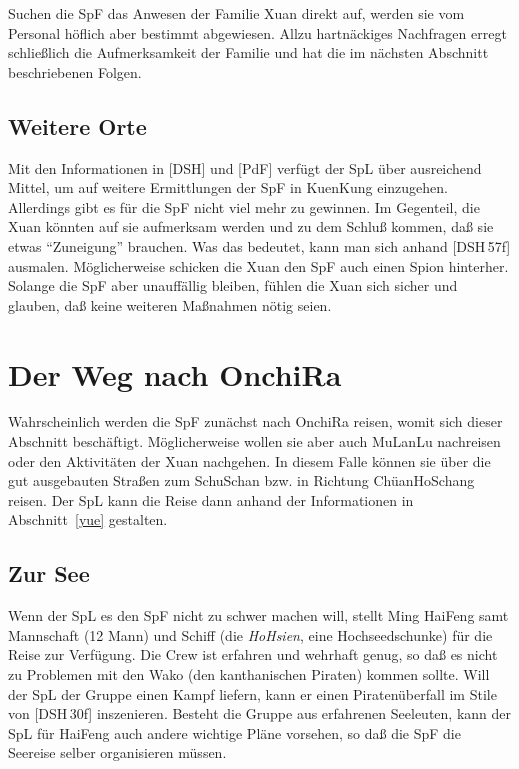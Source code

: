 \documentclass[
a4paper,
twoside,
DIV=calc,
BCOR=4mm,
fontsize=9pt,
twocolumn=on,
titlepage=on,
parskip=half
]{scrartcl}
\begin{document}
Suchen die SpF das Anwesen der Familie Xuan direkt auf, werden sie vom
Personal höflich aber bestimmt abgewiesen. Allzu hartnäckiges
Nachfragen erregt schließlich die Aufmerksamkeit der Familie und hat
die im nächsten Abschnitt beschriebenen Folgen.

\subsection{Weitere Orte}

Mit den Informationen in [DSH] und [PdF] verfügt der SpL über
ausreichend Mittel, um auf weitere Ermittlungen der SpF in KuenKung
einzugehen. Allerdings gibt es für die SpF nicht viel mehr zu
gewinnen. Im Gegenteil, die Xuan könnten auf sie aufmerksam werden
und zu dem Schluß kommen, daß sie etwas "`Zuneigung"' brauchen. Was
das bedeutet, kann man sich anhand [DSH\,57f] ausmalen. Möglicherweise
schicken die Xuan den SpF auch einen Spion hinterher. Solange die SpF
aber unauffällig bleiben, fühlen die Xuan sich sicher und glauben,
daß keine weiteren Maßnahmen nötig seien.

\section{Der Weg nach OnchiRa}

Wahrscheinlich werden die SpF zunächst nach OnchiRa reisen, womit sich
dieser Abschnitt beschäftigt. Möglicherweise wollen sie aber auch
MuLanLu nachreisen oder den Aktivitäten der Xuan nachgehen. In diesem
Falle können sie über die gut ausgebauten Straßen zum SchuSchan
bzw. in Richtung ChüanHoSchang reisen. Der SpL kann die Reise dann
anhand der Informationen in Abschnitt~\ref{yue} gestalten.

\subsection{Zur See}

Wenn der SpL es den SpF nicht zu schwer machen will, stellt Ming
HaiFeng samt Mannschaft (12 Mann) und Schiff (die \emph{HoHsien}, eine
Hochseedschunke) für die Reise zur Verfügung. Die Crew ist erfahren
und wehrhaft genug, so daß es nicht zu Problemen mit den Wako (den
kanthanischen Piraten) kommen sollte. Will der SpL der Gruppe einen
Kampf liefern, kann er einen Piratenüberfall im Stile von [DSH\,30f]
inszenieren. Besteht die Gruppe aus erfahrenen Seeleuten, kann der SpL
für HaiFeng auch andere wichtige Pläne vorsehen, so daß die SpF die
Seereise selber organisieren müssen.
\end{document}
